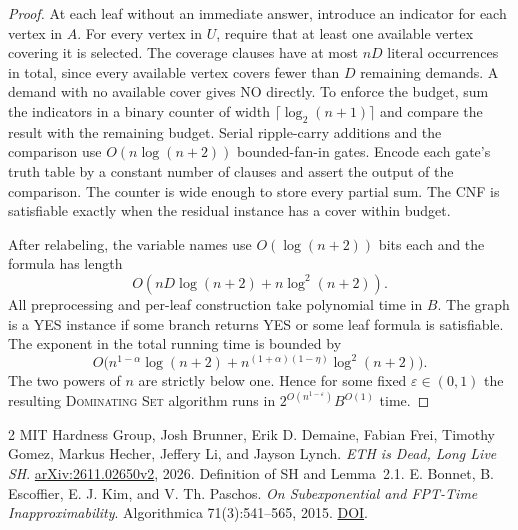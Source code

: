 \documentclass[11pt]{article}
\begin{document}
\begin{proof}
At each leaf without an immediate answer, introduce an indicator for each vertex in $A$. For every vertex in $U$, require that at least one available vertex covering it is selected. The coverage clauses have at most $nD$ literal occurrences in total, since every available vertex covers fewer than $D$ remaining demands. A demand with no available cover gives NO directly. To enforce the budget, sum the indicators in a binary counter of width $\lceil\log_2(n+1)\rceil$ and compare the result with the remaining budget. Serial ripple-carry additions and the comparison use $O(n\log(n+2))$ bounded-fan-in gates. Encode each gate's truth table by a constant number of clauses and assert the output of the comparison. The counter is wide enough to store every partial sum. The CNF is satisfiable exactly when the residual instance has a cover within budget.

After relabeling, the variable names use $O(\log(n+2))$ bits each and the formula has length
\[
O(nD\log(n+2)+n\log^2(n+2)).
\]
All preprocessing and per-leaf construction take polynomial time in $B$. The graph is a YES instance if some branch returns YES or some leaf formula is satisfiable. The exponent in the total running time is bounded by
\[
O\bigl(n^{1-\alpha}\log(n+2)+
 n^{(1+\alpha)(1-\eta)}\log^2(n+2)\bigr).
\]
The two powers of $n$ are strictly below one. Hence for some fixed $\varepsilon\in(0,1)$ the resulting \textsc{Dominating Set} algorithm runs in $2^{O(n^{1-\varepsilon})}B^{O(1)}$ time.
\end{proof}

\begin{thebibliography}{2}
 MIT Hardness Group, Josh Brunner, Erik D. Demaine, Fabian Frei, Timothy Gomez, Markus Hecher, Jeffery Li, and Jayson Lynch.
\emph{ETH is Dead, Long Live SH}. \href{https://arxiv.org/abs/2611.02650v2}{arXiv:2611.02650v2}, 2026. Definition of SH and Lemma~2.1.
 E. Bonnet, B. Escoffier, E. J. Kim, and V. Th. Paschos.
\emph{On Subexponential and FPT-Time Inapproximability}. Algorithmica 71(3):541--565, 2015.
\href{https://doi.org/10.1007/s00453-014-9889-1}{DOI}.
\end{thebibliography}
\end{document}
